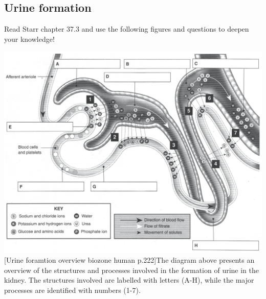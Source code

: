 	
	 \areaset[0cm]{11.5cm}{27.4cm}  
	 
\subsection{Urine formation}
Read  Starr chapter 37.3 and use the following figures and questions to deepen your knowledge!

\hspace{-3cm}
\begin{minipage}{15cm}
	 \includegraphics[width=1\textwidth]{../images/biozone-human-0202_v2.jpg}
		  [Urine foramtion overview biozone human p.222]{The diagram above presents an overview of the structures and processes involved in the formation of urine in the kidney. The structures involved are labelled with letters (A-H), while the major processes are identified with numbers (1-7).}
		  \label{fig:UrineFormationBiozone}
\end{minipage}
